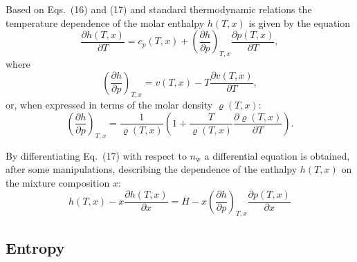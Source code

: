 \documentclass[11pt]{article}
\newcommand{\dens}{\varrho}
\newcommand{\Hbar}{\overline{H}}
\begin{document}
\noindent Based on Eqs.~(16) and (17) and standard thermodynamic
relations the temperature dependence of the molar enthalpy $h(T,x)$ is
given by the equation
\begin{equation}
\frac{\partial h(T,x)}{\partial T}
 = c_p(T,x)
 + \left(\frac{\partial h}{\partial p}\right)_{\!T,x}
   \frac{\partial p(T,x)}{\partial T},
\end{equation}
where
\begin{equation}
\left(\frac{\partial h}{\partial p}\right)_{\!T,x}
 = v(T,x) - T\frac{\partial v(T,x)}{\partial T},
\end{equation}
or, when expressed in terms of the molar density $\dens(T,x)$:
\begin{equation}
\left(\frac{\partial h}{\partial p}\right)_{\!T,x}
 = \frac{1}{\dens(T,x)}
   \left( 1 + \frac{T}{\dens(T,x)}
   \frac{\partial \dens(T,x)}{\partial T} \right).
\end{equation}

\noindent By differentiating Eq.~(17) with respect to
$n_\mathrm{w}$ a differential equation is obtained, after some
manipulations, describing the dependence of the enthalpy $h(T,x)$ on
the mixture composition $x$:
\begin{equation}
h(T,x) - x\frac{\partial h(T,x)}{\partial x}
 = \Hbar - x\left(\frac{\partial h}{\partial p}\right)_{\!T,x}
   \frac{\partial p(T,x)}{\partial x}
\end{equation}


\subsection{Entropy}
\end{document}

